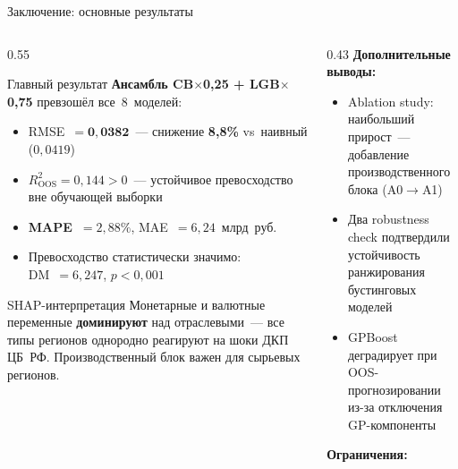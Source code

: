 \documentclass[aspectratio=169,12pt]{beamer}
\begin{document}
\begin{frame}{Заключение: основные результаты}
\begin{columns}[T]
  \begin{column}{0.55\textwidth}
    \begin{block}{Главный результат}
      \textbf{Ансамбль CB$\times$0,25 + LGB$\times$0,75} превзошёл все~8~моделей:
      \begin{itemize}
        \item RMSE~$= \mathbf{0{,}0382}$~---
              снижение \textbf{8,8\%} vs~наивный ($0{,}0419$)
        \item $R^2_{\text{OOS}} = 0{,}144 > 0$~---
              устойчивое превосходство вне обучающей выборки
        \item \textbf{MAPE~$= 2{,}88\%$}, MAE~$= 6{,}24$~млрд~руб.
        \item Превосходство статистически значимо:\\
              DM~$= 6{,}247$, $p < 0{,}001$
      \end{itemize}
    \end{block}
    \vspace{0.3em}
    \begin{block}{SHAP-интерпретация}
      Монетарные и валютные переменные \textbf{доминируют}
      над отраслевыми~--- все типы регионов однородно реагируют
      на шоки ДКП ЦБ~РФ.
      Производственный блок важен для сырьевых регионов.
    \end{block}
  \end{column}
  \begin{column}{0.43\textwidth}
    \textbf{\color{hsedark}Дополнительные выводы:}
    \begin{itemize}
      \small
      \item Ablation study: наибольший прирост~--- добавление производственного блока (A0$\to$A1)
      \item Два robustness check подтвердили устойчивость ранжирования бустинговых моделей
      \item GPBoost деградирует при OOS-прогнозировании из-за отключения GP-компоненты
    \end{itemize}
    \vspace{0.4em}
    \textbf{\color{hsedark}Ограничения:}
    \begin{itemize}
      \small

\end{itemize}
\end{column}
\end{columns}
\end{frame}
\end{document}
